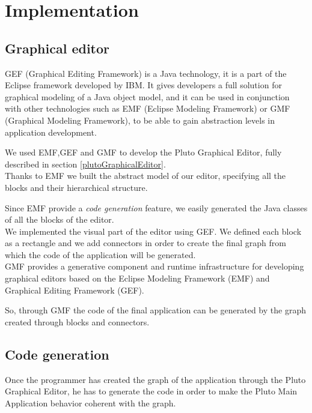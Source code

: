 \chapter{Implementation}
\label{cap5}



\section{Graphical editor}\label{editor}

GEF (Graphical Editing Framework) is a Java technology, it is a part of the Eclipse framework developed by IBM.
It gives developers a full solution for graphical modeling of a Java object model, and it can be used in conjunction with other technologies such as EMF (Eclipse Modeling Framework) or GMF (Graphical Modeling Framework), to be able to gain
abstraction levels in application development.

We used EMF,GEF and GMF to develop the Pluto Graphical Editor, fully described in section \ref{plutoGraphicalEditor}.
\\

Thanks to EMF we built the abstract model of our editor, specifying all the blocks and their hierarchical structure.

Since EMF provide a \textit{code generation} feature, we easily generated the Java classes of all the blocks of the editor.
\\

We implemented the visual part of the editor using GEF.
We defined each block as a rectangle and we add connectors in order to create the final graph from which the code of the application will be generated.
\\

GMF provides a generative component and runtime infrastructure for developing graphical editors based on the Eclipse Modeling Framework (EMF) and Graphical Editing Framework (GEF).

So, through GMF the code of the final application can be generated by the graph created through blocks and connectors.

\section{Code generation}\label{codeGeneration}


Once the programmer has created the graph of the application through the Pluto Graphical Editor, he has to generate the code in order to make the Pluto Main Application behavior coherent with the graph.

